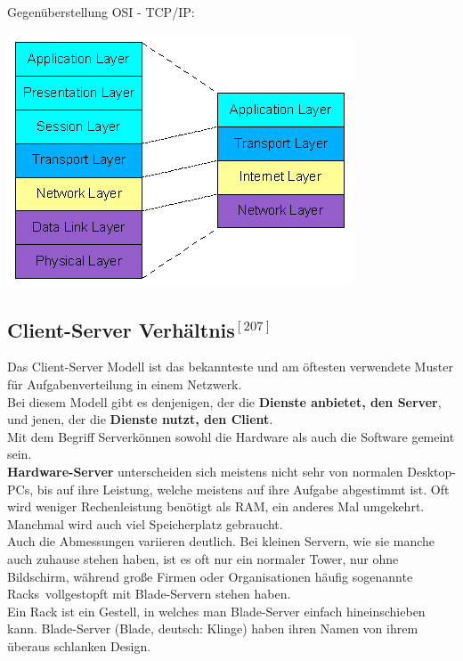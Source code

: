 \documentclass[12pt,a4paper]{report}
\begin{document}
\begin{onehalfspace}
Gegenüberstellung OSI - TCP/IP:\\
\begin{center}
\includegraphics[scale=0.7]{../docs/tarkes/pics/ositcpip.png}
\end{center}
\subsection*{Client-Server Verhältnis$^{[207]}$}\label{ssec:client-server}
Das Client-Server Modell ist das bekannteste und am öftesten verwendete Muster für Aufgabenverteilung in einem Netzwerk.\\ 
Bei diesem Modell gibt es denjenigen, der die \textbf{Dienste anbietet, den Server}, und jenen, der die \textbf{Dienste nutzt, den Client}.\\

Mit dem Begriff \glqq Server\grqq können sowohl die Hardware als auch die Software gemeint sein.\\

\textbf{Hardware-Server} unterscheiden sich meistens nicht sehr von normalen Desktop-PCs, bis auf ihre Leistung, welche meistens auf ihre Aufgabe abgestimmt ist. Oft wird weniger Rechenleistung benötigt als RAM, ein anderes Mal umgekehrt. Manchmal wird auch viel Speicherplatz gebraucht.\\
Auch die Abmessungen variieren deutlich. Bei kleinen Servern, wie sie manche auch zuhause stehen haben, ist es oft nur ein normaler Tower, nur ohne Bildschirm, während große Firmen oder Organisationen häufig sogenannte \glqq Racks\grqq \ vollgestopft mit Blade-Servern stehen haben.\\
Ein Rack ist ein Gestell, in welches man Blade-Server einfach hineinschieben kann. Blade-Server (Blade, deutsch: Klinge) haben ihren Namen von ihrem überaus schlanken Design.\\


\end{onehalfspace}
\end{document}
